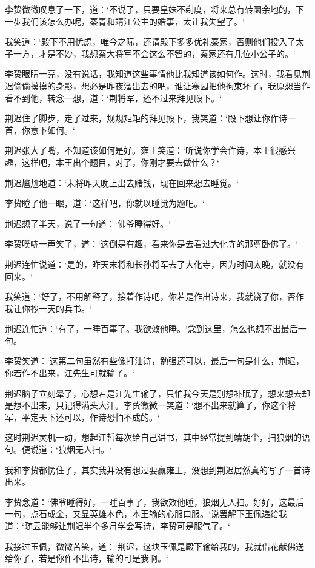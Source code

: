 李贽微微叹息了一下，道：‘不说了，只要皇妹不剃度，将来总有转圜余地的，下一步我们该怎么办呢，秦青和靖江公主的婚事，太让我失望了。‘

我笑道：‘殿下不用忧虑，唯今之际，还请殿下多多优礼秦家，否则他们投入了太子一方，才是不妙，我想秦大将军不会这么不智的，秦家还有几位小公子的。‘

李贽眼睛一亮，没有说话，我知道这些事情他比我知道该如何作。这时，我看见荆迟偷偷摸摸的身影，想必是昨夜溜出去的吧，谁让寒园把他拘束坏了，我原想当作看不到他，转念一想，道：‘荆将军，还不过来拜见殿下。‘

荆迟住了脚步，走了过来，规规矩矩的拜见殿下，我笑道：‘殿下想让你作诗一首，你意下如何。‘

荆迟张大了嘴，不知道该如何是好。雍王笑道：‘听说你学会作诗，本王很感兴趣，这样吧，本王出个题目，对了，你刚才要去做什么？‘

荆迟尴尬地道：‘末将昨天晚上出去赌钱，现在回来想去睡觉。‘

李贽瞪了他一眼，道：‘这样吧，你就以睡觉为题吧。‘

荆迟想了半天，说了一句道：‘佛爷睡得好。‘

李贽噗哧一声笑了，道：‘这倒是有趣，看来你是去看过大化寺的那尊卧佛了。‘

荆迟连忙说道：‘是的，昨天末将和长孙将军去了大化寺，因为时间太晚，就没有回来。‘

我笑道：‘好了，不用解释了，接着作诗吧，你若是作出诗来，我就饶了你，否作我让你抄一天的兵书。‘

荆迟连忙道：‘有了，一睡百事了。我欲效他睡。‘念到这里，怎么也想不出最后一句。

李贽笑道：‘这第二句虽然有些像打油诗，勉强还可以，最后一句是什么，荆迟，你若作不出来，江先生可就输了。‘

荆迟脑子立刻晕了，心想若是江先生输了，只怕我今天是别想补眠了，想来想去却是想不出来，只记得满头大汗。李贽微微一笑道：‘想不出来就算了，你这个将军，平定天下还可以，作诗恐怕不成的。‘

这时荆迟灵机一动，想起江哲每次给自己讲书，其中经常提到靖胡尘，扫狼烟的语句。便说道：‘狼烟无人扫。‘

我和李贽都愣住了，其实我并没有想过要赢雍王，没想到荆迟居然真的写了一首诗出来。

李贽念道：‘佛爷睡得好，一睡百事了，我欲效他睡，狼烟无人扫。好好，这最后一句，点石成金，又显英雄本色，本王输的心服口服。‘说罢解下玉佩递给我道：‘随云能够让荆迟半个多月学会写诗，李贽可是服气了。‘

我接过玉佩，微微苦笑，道：‘荆迟，这块玉佩是殿下输给我的，我就借花献佛送给你了，若是你作不出诗，输的可是我啊。‘

